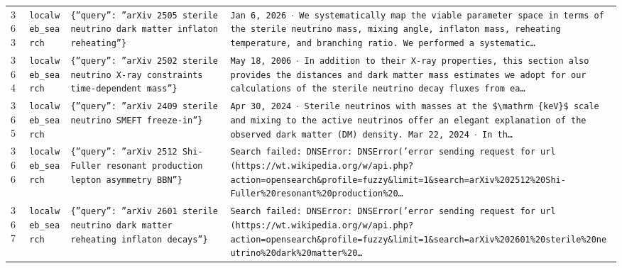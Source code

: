 \documentclass[11pt,a4paper]{article}
\begin{document}
\begin{longtable}{@{}p{}p{}p{}p{}@{}}
363 & \texttt{local}\newline\texttt{web\_\allowbreak{}search} & \texttt{\{''query'':\allowbreak{} ''arXiv 2505 sterile neutrino dark matter inflaton reheating''\}\allowbreak{}} & \texttt{Jan 6,\allowbreak{} 2026 $\cdot$ We systematically map the viable parameter space in terms of the sterile neutrino mass,\allowbreak{} mixing angle,\allowbreak{} inflaton mass,\allowbreak{} reheating temperature,\allowbreak{} and branching ratio. We performed a systematic\ldots{}\allowbreak{}} \\
364 & \texttt{local}\newline\texttt{web\_\allowbreak{}search} & \texttt{\{''query'':\allowbreak{} ''arXiv 2502 sterile neutrino X-ray constraints time-dependent mass''\}\allowbreak{}} & \texttt{May 18,\allowbreak{} 2006 $\cdot$ In addition to their X-ray properties,\allowbreak{} this section also provides the distances and dark matter mass estimates we adopt for our calculations of the sterile neutrino decay fluxes from ea\ldots{}\allowbreak{}} \\
365 & \texttt{local}\newline\texttt{web\_\allowbreak{}search} & \texttt{\{''query'':\allowbreak{} ''arXiv 2409 sterile neutrino SMEFT freeze-in''\}\allowbreak{}} & \texttt{Apr 30,\allowbreak{} 2024 $\cdot$ Sterile neutrinos with masses at the \$\textbackslash{}\allowbreak{}mathrm \{keV\}\allowbreak{}\$ scale and mixing to the active neutrinos offer an elegant explanation of the observed dark matter (DM)\allowbreak{} density. Mar 22,\allowbreak{} 2024 $\cdot$ In th\ldots{}\allowbreak{}} \\
366 & \texttt{local}\newline\texttt{web\_\allowbreak{}search} & \texttt{\{''query'':\allowbreak{} ''arXiv 2512 Shi-Fuller resonant production lepton asymmetry BBN''\}\allowbreak{}} & \texttt{Search failed:\allowbreak{} DNSError:\allowbreak{} DNSError('error sending request for url (https:\allowbreak{}/\allowbreak{}/\allowbreak{}wt.wikipedia.org/\allowbreak{}w/\allowbreak{}api.php?action=\allowbreak{}opensearch\&profile=\allowbreak{}fuzzy\&limit=\allowbreak{}1\&search=\allowbreak{}arXiv\%202512\%20Shi-Fuller\%20resonant\%20production\%20\ldots{}\allowbreak{}} \\
367 & \texttt{local}\newline\texttt{web\_\allowbreak{}search} & \texttt{\{''query'':\allowbreak{} ''arXiv 2601 sterile neutrino dark matter reheating inflaton decays''\}\allowbreak{}} & \texttt{Search failed:\allowbreak{} DNSError:\allowbreak{} DNSError('error sending request for url (https:\allowbreak{}/\allowbreak{}/\allowbreak{}wt.wikipedia.org/\allowbreak{}w/\allowbreak{}api.php?action=\allowbreak{}opensearch\&profile=\allowbreak{}fuzzy\&limit=\allowbreak{}1\&search=\allowbreak{}arXiv\%202601\%20sterile\%20neutrino\%20dark\%20matter\%20\ldots{}\allowbreak{}} \\

\end{longtable}
\end{document}
